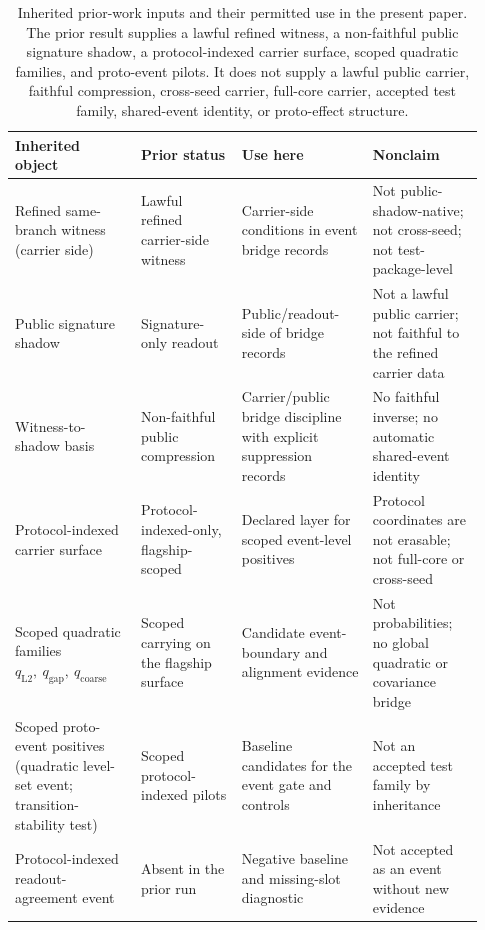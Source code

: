 \documentclass[11pt]{article}
\theoremstyle{definition}
\begin{document}
\begin{table}[t]
\centering
\small
\setlength{\tabcolsep}{4pt}
\begin{tabular}{p{0.25\linewidth}p{0.20\linewidth}p{0.26\linewidth}p{0.22\linewidth}}
\hline
\textbf{Inherited object} & \textbf{Prior status} & \textbf{Use here} & \textbf{Nonclaim} \\
\hline
Refined same-branch witness (carrier side)
&
Lawful refined carrier-side witness
&
Carrier-side conditions in event bridge records
&
Not public-shadow-native; not cross-seed; not test-package-level
\\[0.5em]
Public signature shadow
&
Signature-only readout
&
Public/readout-side of bridge records
&
Not a lawful public carrier; not faithful to the refined carrier data
\\[0.5em]
Witness-to-shadow basis
&
Non-faithful public compression
&
Carrier/public bridge discipline with explicit suppression records
&
No faithful inverse; no automatic shared-event identity
\\[0.5em]
Protocol-indexed carrier surface
&
Protocol-indexed-only, flagship-scoped
&
Declared layer for scoped event-level positives
&
Protocol coordinates are not erasable; not full-core or cross-seed
\\[0.5em]
Scoped quadratic families $q_{\mathrm{L2}},\ q_{\mathrm{gap}},\ q_{\mathrm{coarse}}$
&
Scoped carrying on the flagship surface
&
Candidate event-boundary and alignment evidence
&
Not probabilities; no global quadratic or covariance bridge
\\[0.5em]
Scoped proto-event positives (quadratic level-set event; transition-stability test)
&
Scoped protocol-indexed pilots
&
Baseline candidates for the event gate and controls
&
Not an accepted test family by inheritance
\\[0.5em]
Protocol-indexed readout-agreement event
&
Absent in the prior run
&
Negative baseline and missing-slot diagnostic
&
Not accepted as an event without new evidence
\\
\hline
\end{tabular}
\caption{Inherited prior-work inputs and their permitted use in the present paper. The prior result supplies a lawful refined witness, a non-faithful public signature shadow, a protocol-indexed carrier surface, scoped quadratic families, and proto-event pilots. It does not supply a lawful public carrier, faithful compression, cross-seed carrier, full-core carrier, accepted test family, shared-event identity, or proto-effect structure.}
\label{tab:prior-inputs-permissions}
\end{table}
\end{document}
